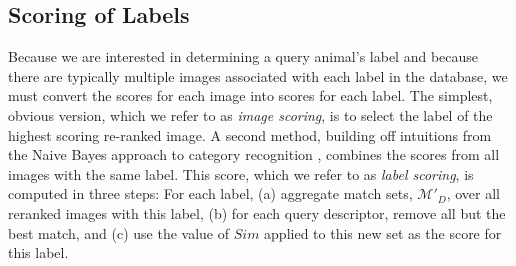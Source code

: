\subsection {Scoring of Labels} \label{sec:nmscore1}

Because we are interested in determining a query animal's label and
because there are typically multiple images associated with each label
in the database, we must convert the scores for each image into scores
for each label.  The simplest, obvious version, which we refer to as
\emph{image scoring}, is to select the label of the highest scoring re-ranked image.
 A second method, building off intuitions from
the Naive Bayes approach to category recognition
\cite{cvpr08BoimanInDefenseNN,cvpr11McCannLNBNN}, combines the scores from all
images with the same label.  This score, which we refer to as \emph{label scoring}, is computed in three steps: For each label, (a) aggregate match sets,
$\mathcal{M}'_D$, over all reranked images with this label, (b)
 for each query descriptor, remove all but the best match, and (c) use the value of $Sim$ applied to this new set as the score for this label.
%
